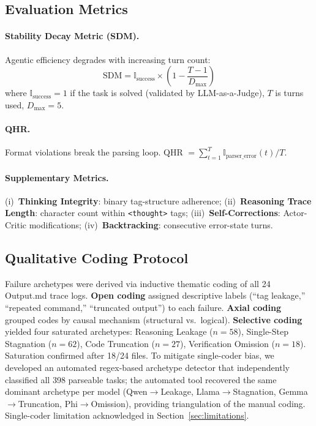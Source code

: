 \documentclass{article}
\begin{document}
\subsection{Evaluation Metrics}

\paragraph{Stability Decay Metric (SDM).} Agentic efficiency degrades with increasing turn count:
\begin{equation}
  \text{SDM} = \mathbb{I}_{\text{success}} \times \left(1 - \frac{T - 1}{D_{\max}}\right)
\end{equation}
where $\mathbb{I}_{\text{success}} = 1$ if the task is solved (validated by LLM-as-a-Judge), $T$ is turns used, $D_{\max} = 5$.

\paragraph{QHR.} Format violations break the parsing loop. QHR $= \sum_{t=1}^{T} \mathbb{I}_{\text{parser\_error}}(t) / T$.

\paragraph{Supplementary Metrics.} (i)~\textbf{Thinking Integrity}: binary tag-structure adherence; (ii)~\textbf{Reasoning Trace Length}: character count within \texttt{<thought>} tags; (iii)~\textbf{Self-Corrections}: Actor-Critic modifications; (iv)~\textbf{Backtracking}: consecutive error-state turns.

\subsection{Qualitative Coding Protocol}
\label{sec:coding}

Failure archetypes were derived via inductive thematic coding of all 24 Output.md trace logs. \textbf{Open coding} assigned descriptive labels (``tag leakage,'' ``repeated command,'' ``truncated output'') to each failure. \textbf{Axial coding} grouped codes by causal mechanism (structural vs.\ logical). \textbf{Selective coding} yielded four saturated archetypes: Reasoning Leakage ($n{=}58$), Single-Step Stagnation ($n{=}62$), Code Truncation ($n{=}27$), Verification Omission ($n{=}18$). Saturation confirmed after 18/24 files. To mitigate single-coder bias, we developed an automated regex-based archetype detector that independently classified all 398 parseable tasks; the automated tool recovered the same dominant archetype per model (Qwen$\to$Leakage, Llama$\to$Stagnation, Gemma$\to$Truncation, Phi$\to$Omission), providing triangulation of the manual coding. Single-coder limitation acknowledged in Section~\ref{sec:limitations}.
\end{document}
